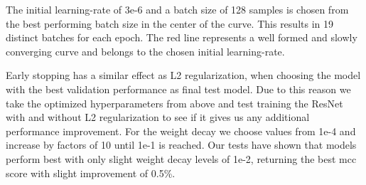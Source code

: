 The initial \gls{learning-rate} of 3e-6 and a batch size of 128 samples is chosen from the best performing batch size in the center of the curve. This results in 19 distinct batches for each epoch. 
The red line represents a well formed and slowly converging curve and belongs to the chosen initial \gls{learning-rate}.

Early stopping has a similar effect as L2 regularization, when choosing the model with the best validation performance as final test model. Due to this reason we take the optimized hyperparameters from above and test training the ResNet with and without L2 regularization to see if it gives us any additional performance improvement. For the weight decay we choose values from 1e-4 and increase by factors of 10 until 1e-1 is reached. Our tests have shown that models perform best with only slight weight decay levels of 1e-2, returning the best \acrshort{mcc} score with slight improvement of 0.5\%.

